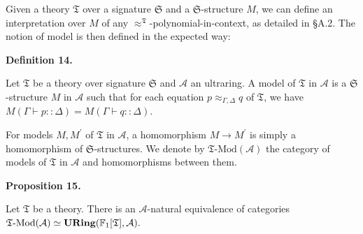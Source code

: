  
 
 
Given a theory $\mathfrak{T}$ over a signature $\mathfrak{S}$ and a $\mathfrak{S}$-structure $M$, we can define an interpretation over $M$ of any $\approx^{\mathfrak{T}}$-polynomial-in-context, as detailed in §A.2. The notion of model is then defined in the expected way:\par
 
 
 
\par\medskip\noindent\textbf{Definition 14.}\par
 
 
Let $\mathfrak{T}$ be a theory over signature $\mathfrak{S}$ and $\mathcal{A}$ an ultraring. A model of $\mathfrak{T}$ in $\mathcal{A}$ is a $\mathfrak{S}$-structure $M$ in $\mathcal{A}$ such that for each equation $p\approx_{\Gamma,\Delta}q$ of $\mathfrak{T}$, we have $M(\Gamma\vdash p::\Delta)=M(\Gamma\vdash q::\Delta)$.\par
 
 
 
For models $M,M^{\prime}$ of $\mathfrak{T}$ in $\mathcal{A}$, a homomorphism $M\to M^{\prime}$ is simply a homomorphism of $\mathfrak{S}$-structures. We denote by $\mathfrak{T}\text{-}\mathrm{Mod}(\mathcal{A})$ the category of models of $\mathfrak{T}$ in $\mathcal{A}$ and homomorphisms between them.\par
 
 
 
 
\par\medskip\noindent\textbf{Proposition 15.}\par
 
 
Let $\mathfrak{T}$ be a theory. There is an $\mathcal{A}$-natural equivalence of categories $\mathfrak{T}\text{-}\mathrm{Mod}(\mathcal{A})\simeq\mathbf{URing}(\mathbb{F}_{%
1}[\mathfrak{T}],\mathcal{A}).$\par
 
 
